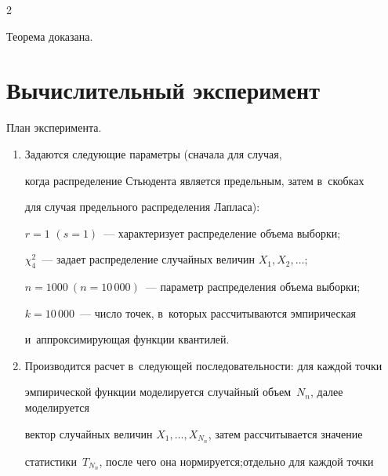 \begin{multicols}{2}
\vspace*{-6pt}



\noindent

Теорема доказана.



\vspace*{-6pt}



\section{Вычислительный эксперимент}






План эксперимента.

\begin{enumerate}[1.]

    \item   Задаются следующие параметры (сначала для случая, 

    когда распределение Стьюдента является предельным, затем в~скобках 

    для случая предельного распределения Лапласа): 



        $r =1$ $(s=1)$~--- характеризует распределение объема выборки; 



        $\chi^{2}_{4}$~--- задает распределение случайных величин $X_1,X_2,\ldots$; 



        $n = 1000 \:(n = 10\,000)$~--- параметр распределения объема выборки;



        $k = 10\,000$~--- число точек, в~которых рассчитываются эмпирическая 

        и~аппроксимирующая функции квантилей.

    \item   Производится расчет в~следующей последовательности: для каждой точки 

    эмпирической функции моделируется случайный объем~$N_n$, далее моделируется 

    вектор случайных величин $X_1,\ldots,X_{N_n}$, затем рассчитывается значение 

    статистики~$T_{N_n}$, после чего она нормируется;\linebreak отдельно для каж\-дой точ\-ки 


\end{enumerate}
\end{multicols}
